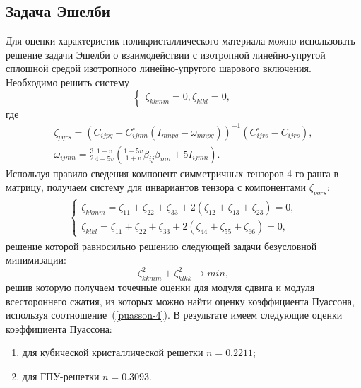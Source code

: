 \documentclass[12pt, a4paper]{article}
\begin{document}
\subsection{Задача Эшелби}
Для оценки характеристик поликристаллического материала можно использовать решение задачи Эшелби о взаимодействии с изотропной линейно-упругой сплошной средой изотропного линейно-упругого шарового включения. Необходимо решить
систему
\[
\begin{cases}
	\zeta_{kkmm} = 0,
	\zeta_{klkl} = 0,
\end{cases}
\]
где
\begin{gather*}
	\zeta_{pqrs} = \left(C_{ijpq} - C_{ijmn}^{\circ} \left(I_{mnpq} - \omega_{mnpq} \right)\right)^{-1} \left(C_{ijrs}^{\circ} - C_{ijrs} \right),\\
	\omega_{ijmn} = \frac{3}{2} \frac{1- v}{4- 5v} \left(\frac{1 - 5v}{1+v}\beta_{ij}\beta_{mn} + 5 I_{ijmn} \right).
\end{gather*}
Используя правило сведения компонент симметричных тензоров 4-го ранга в матрицу, получаем систему для инвариантов тензора с компонентами $\zeta_{pqrs}$:
\begin{gather*}
	\begin{cases}
		\zeta_{kkmm} = \zeta_{11} + \zeta_{22} + \zeta_{33} + 2 (\zeta_{12} + \zeta_{13} + \zeta_{23}) = 0,\\
		\zeta_{klkl} = \zeta_{11} + \zeta_{22} + \zeta_{33} + 2 (\zeta_{44} + \zeta_{55} + \zeta_{66}) = 0,
	\end{cases}
\end{gather*}
решение которой равносильно решению следующей задачи безусловной минимизации:
\[
\zeta^2_{kkmm} + \zeta^2_{klkk} \rightarrow min,
\]
решив которую получаем точечные оценки для модуля сдвига и модуля всестороннего сжатия, из которых можно найти оценку коэффициента Пуассона, используя
соотношение~(\ref{puasson-4}).
В результате имеем следующие оценки коэффициента Пуассона:
\begin{enumerate}
\item для кубической кристаллической решетки $n = 0.2211$;
\item для ГПУ-решетки $n = 0.3093$.
\end{enumerate}
\end{document}

